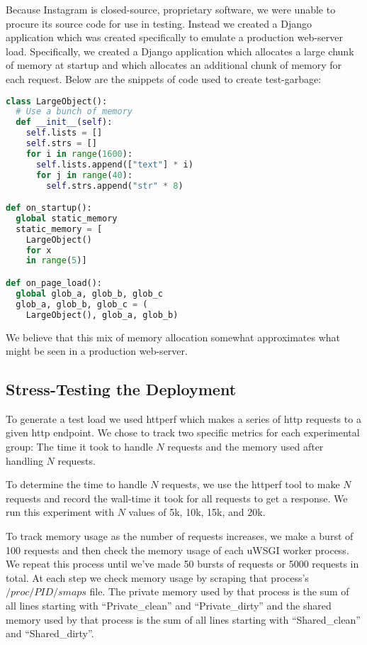 \documentclass{article}
\begin{document}
\begin{sloppypar}
Because Instagram is closed-source, proprietary software, we were unable to procure its source code for use in testing.  Instead we created a Django application which was created specifically to emulate a production web-server load.  Specifically, we created a Django application which allocates a large chunk of memory at startup and which allocates an additional chunk of memory for each request.  Below are the snippets of code used to create test-garbage:

\noindent
\begin{minipage}{\linewidth}
\begin{lstlisting}[language=python]
class LargeObject():
  # Use a bunch of memory
  def __init__(self):
    self.lists = []
    self.strs = []
    for i in range(1600):
      self.lists.append(["text"] * i)
      for j in range(40):
        self.strs.append("str" * 8)

def on_startup():
  global static_memory
  static_memory = [
    LargeObject()
    for x
    in range(5)]

def on_page_load():
  global glob_a, glob_b, glob_c
  glob_a, glob_b, glob_c = (
    LargeObject(), glob_a, glob_b)
\end{lstlisting}
\end{minipage}

We believe that this mix of memory allocation somewhat approximates what might be seen in a production web-server.  

\subsection{Stress-Testing the Deployment}

To generate a test load we used httperf which makes a series of http requests to a given http endpoint.  We chose to track two specific metrics for each experimental group: The time it took to handle $N$ requests and the memory used after handling $N$ requests.

To determine the time to handle $N$ requests, we use the httperf tool to make $N$ requests and record the wall-time it took for all requests to get a response.  We run this experiment with $N$ values of 5k, 10k, 15k, and 20k.  

To track memory usage as the number of requests increases, we make a burst of 100 requests and then check the memory usage of each uWSGI worker process.  We repeat this process until we've made 50 bursts of requests or 5000 requests in total.  At each step we check memory usage by scraping that process's $/proc/PID/smaps$ file.  The private memory used by that process is the sum of all lines starting with ``Private\_clean'' and ``Private\_dirty'' and the shared memory used by that process is the sum of all lines starting with ``Shared\_clean'' and ``Shared\_dirty''.  


\end{sloppypar}
\end{document}
